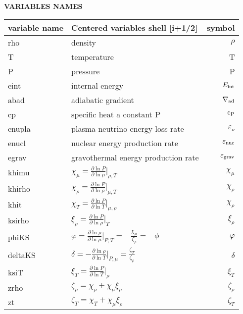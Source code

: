 \documentclass[10pt]{article}
\begin{document}
\newpage

\begin{center}
{\Large \sf \textbf{VARIABLES NAMES}}
\renewcommand{\baselinestretch}{1.05}
\vspace{1.0cm}

\begin{tabular}[@{\renewcommand{\baselinestretch}{5}}]{|l| lr|}

\hline
{\bf \sf variable name} & {\bf \sf Centered variables shell [i+1/2] } &
{\bf \sf symbol }\\\hline \hline
rho & density & $\rho$ \\
T & temperature  &T \\
P & pressure  &P \\
eint & internal energy & $E_{\rm int}$ \\
abad & adiabatic gradient & $\nabla_{\rm ad}$ \\
cp & specific heat a constant P & $\rm c_P$ \\
enupla & plasma neutrino energy loss rate & $\varepsilon_\nu$ \\
enucl & nuclear energy production rate & $\varepsilon_{\rm nuc}$ \\
egrav & gravothermal energy production rate & $\varepsilon_{\rm grav}$ \\ 
khimu & $\chi_\mu =  \frac{\partial \ln P }{\partial \ln \mu}\big|_{\rho,T}$ &
$\chi_\mu$ \\
khirho & $\chi_\rho = \frac{\partial \ln P }{\partial \ln
  \rho}\big|_{\mu,T}$ &$\chi_\rho$  \\
khit & $\chi_T =  \frac{\partial \ln P }{\partial \ln T}\big|_{\mu,\rho}$
& $\chi_\rho$   \\
ksirho & $\xi_\rho = \frac{\partial \ln P }{\partial \ln
  \rho}\big|_{T}$ & $\xi_\rho$  \\
phiKS & $\varphi = \frac{\partial \ln \rho }{\partial \ln
  \mu}\big|_{P,T} = - \frac{\chi_\mu}{\zeta_\rho} = - \phi$  & $\varphi$ \\
deltaKS & $\delta = -\frac{\partial \ln \rho }{\partial \ln
 T}\big|_{P,\mu}= \frac{\zeta_T}{\zeta_\rho}$  & $\delta$ \\
ksiT & $\xi_T = \frac{\partial \ln P }{\partial \ln
  T}\big|_{\rho}$ & $\xi_T$  \\
zrho & $\zeta_\rho = \chi_{\rho}+ \chi_\mu \xi_\rho$ & $\zeta_\rho$ \\
zt & $\zeta_T = \chi_T+ \chi_\mu \xi_\rho$ & $\zeta_T$ \\

\end{tabular}
\end{center}
\end{document}

